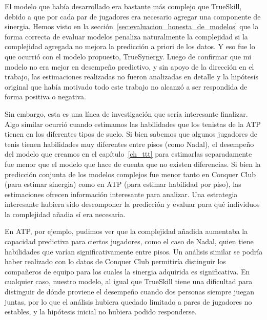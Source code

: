 \documentclass[a4paper,11pt]{book}
\theoremstyle{definition}
\begin{document}

El modelo que hab\'ia desarrollado era bastante m\'as complejo que TrueSkill, debido a que por cada par de jugadores era necesario agregar una componente de sinergia.
%
Hemos visto en la secci\'on~\ref{sec:evaluacion_honesta_de_modelos} que la forma correcta de evaluar modelos penaliza naturalmente la complejidad si la complejidad agregada no mejora la predicci\'on a priori de los datos.
%
Y eso fue lo que ocurri\'o con el modelo propuesto, TrueSynergy.
%
Luego de confirmar que mi modelo no era mejor en desempe\~no predictivo, y sin apoyo de la direcci\'on en el trabajo, las estimaciones realizadas no fueron analizadas en detalle y la hip\'otesis original que hab\'ia motivado todo este trabajo no alcanz\'o a ser respondida de forma positiva o negativa.


Sin embargo, esta es una l\'inea de investigaci\'on que ser\'ia interesante finalizar.
%
Algo similar ocurri\'o cuando estimamos las habilidades que los tenistas de la ATP tienen en los diferentes tipos de suelo.
%
Si bien sabemos que algunos jugadores de tenis tienen habilidades muy diferentes entre pisos (como Nadal), el desempe\~no del modelo que creamos en el cap\'itulo~\ref{ch_ttt} para estimarlas separadamente fue menor que el modelo que hace de cuenta que no existen diferencias.
%
Si bien la predicci\'on conjunta de los modelos complejos fue menor tanto en Conquer Club (para estimar sinergia) como en ATP (para estimar habilidad por piso), las estimaciones ofrecen informaci\'on interesante para analizar.
%
Una estrategia interesante hubiera sido descomponer la predicci\'on y evaluar para qu\'e individuos la complejidad a\~nadia s\'i era necesaria.


En ATP, por ejemplo, pudimos ver que la complejidad a\~nadida aumentaba la capacidad predictiva para ciertos jugadores, como el caso de Nadal, quien tiene habilidades que var\'ian significativamente entre pisos.
%
Un an\'alisis similar se podr\'ia haber realizado con lo datos de Conquer Club permitir\'ia distinguir los compa\~neros de equipo para los cuales la sinergia adquirida es significativa.
%
En cualquier caso, nuestro modelo, al igual que TrueSkill tiene una dificultad para distinguir de d\'onde proviene el desempe\~no cuando dos personas siempre juegan juntas, por lo que el an\'alisis hubiera quedado limitado a pares de jugadores no estables, y la hip\'otesis inicial no hubiera podido responderse.
\end{document}
